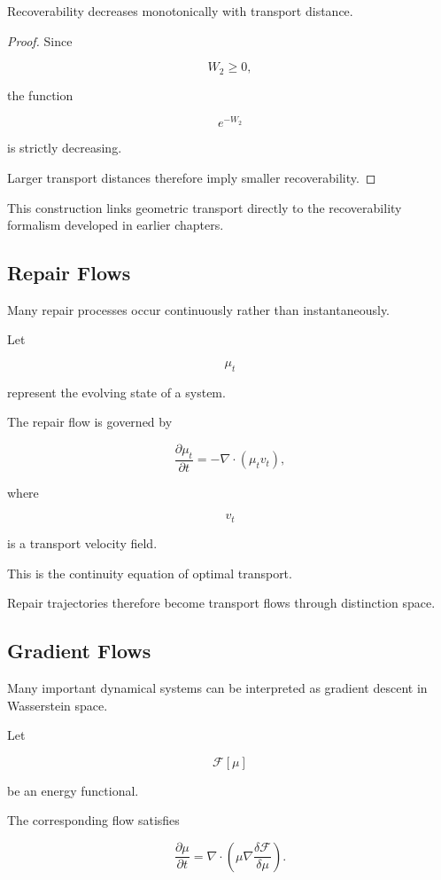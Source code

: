 \documentclass[12pt,twoside,openright]{book}
\newenvironment{prop}
{\begin{proposition}{}{}}
{\end{proposition}}
\begin{document}
\begin{prop}
Recoverability decreases monotonically with transport
distance.
\end{prop}

\begin{proof}
Since

\[
W_2\ge0,
\]

the function

\[
e^{-W_2}
\]

is strictly decreasing.

Larger transport distances therefore imply smaller
recoverability.
\end{proof}

This construction links geometric transport directly to
the recoverability formalism developed in earlier
chapters.

\subsection{Repair Flows}

Many repair processes occur continuously rather than
instantaneously.

Let

\[
\mu_t
\]

represent the evolving state of a system.

The repair flow is governed by

\[
\frac{\partial\mu_t}{\partial t}
=

-\nabla\cdot(\mu_t v_t),
\]

where

\[
v_t
\]

is a transport velocity field.

This is the continuity equation of optimal transport.

Repair trajectories therefore become transport flows
through distinction space.

\subsection{Gradient Flows}

Many important dynamical systems can be interpreted as
gradient descent in Wasserstein space.

Let

\[
\mathcal F[\mu]
\]

be an energy functional.

The corresponding flow satisfies

\[
\frac{\partial\mu}{\partial t}
=

\nabla\cdot
\left(
\mu
\nabla
\frac{\delta\mathcal F}{\delta\mu}
\right).
\]
\end{document}
